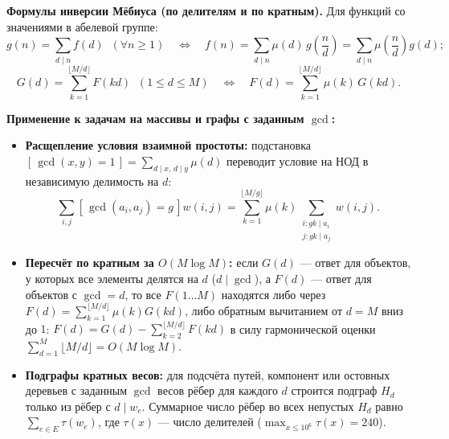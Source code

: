 \documentclass[10pt,a4paper]{article}
\renewcommand{\le}{\leqslant}
\renewcommand{\ge}{\geqslant}
\newcommand{\iverson}[1]{[\,#1\,]}
\begin{document}
\textbf{Формулы инверсии Мёбиуса (по делителям и по кратным).} Для функций со значениями в абелевой группе:
\[
  g(n) = \sum_{d \mid n} f(d) \;\; (\forall n \ge 1) \quad \Longleftrightarrow \quad
  f(n) = \sum_{d \mid n} \mu(d)\, g\!\left(\frac{n}{d}\right) = \sum_{d \mid n} \mu\!\left(\frac{n}{d}\right) g(d);
\]
\[
  G(d) = \sum_{k=1}^{\lfloor M / d \rfloor} F(kd) \;\; (1 \le d \le M) \quad \Longleftrightarrow \quad
  F(d) = \sum_{k=1}^{\lfloor M / d \rfloor} \mu(k)\, G(kd).
\]

\textbf{Применение к задачам на массивы и графы с заданным $\gcd$:}
\begin{itemize}
  \item \textbf{Расщепление условия взаимной простоты:} подстановка $\iverson{\gcd(x, y) = 1} = \sum_{d \mid x,\, d \mid y} \mu(d)$ переводит условие на НОД в независимую делимость на $d$:
  \[
    \sum_{i, j} \iverson{\gcd(a_i, a_j) = g} w(i, j) = \sum_{k=1}^{\lfloor M / g \rfloor} \mu(k) \sum_{\substack{i : gk \mid a_i \\ j : gk \mid a_j}} w(i, j).
  \]
  \item \textbf{Пересчёт по кратным за $O(M \log M)$:} если $G(d)$ — ответ для объектов, у которых все элементы делятся на $d$ ($d \mid \gcd$), а $F(d)$ — ответ для объектов с $\gcd = d$, то все $F(1 \dots M)$ находятся либо через $F(d) = \sum_{k=1}^{\lfloor M/d \rfloor} \mu(k) G(kd)$, либо обратным вычитанием от $d = M$ вниз до $1$: $F(d) = G(d) - \sum_{k=2}^{\lfloor M/d \rfloor} F(kd)$ в силу гармонической оценки $\sum_{d=1}^M \lfloor M / d \rfloor = O(M \log M)$.
  \item \textbf{Подграфы кратных весов:} для подсчёта путей, компонент или остовных деревьев с заданным $\gcd$ весов рёбер для каждого $d$ строится подграф $H_d$ только из рёбер с $d \mid w_e$. Суммарное число рёбер во всех непустых $H_d$ равно $\sum_{e \in E} \tau(w_e)$, где $\tau(x)$ — число делителей ($\max_{x \le 10^6} \tau(x) = 240$).
\end{itemize}
\end{document}
